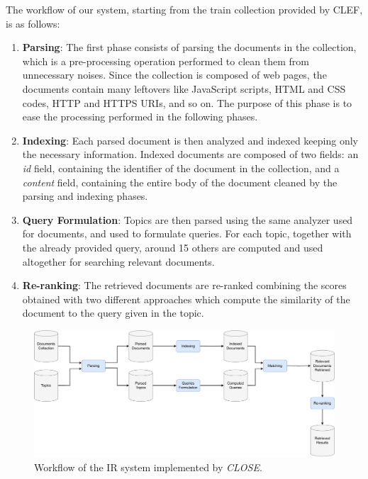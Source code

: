The workflow of our system, starting from the train collection provided by \ac{CLEF}, is as follows:
\begin{enumerate}
    \item \textbf{Parsing}: The first phase consists of parsing the documents in the collection, which is a pre-processing operation performed to clean them from unnecessary noises. Since the collection is composed of web pages, the documents contain many leftovers like JavaScript scripts, HTML and CSS codes, HTTP and HTTPS URIs, and so on. The purpose of this phase is to ease the processing performed in the following phases.

    \item \textbf{Indexing}: Each parsed document is then analyzed and indexed keeping only the necessary information. Indexed documents are composed of two fields: an \textit{id} field, containing the identifier of the document in the collection, and a \textit{content} field, containing the entire body of the document cleaned by the parsing and indexing phases.

    \item \textbf{Query Formulation}: Topics are then parsed using the same analyzer used for documents, and used to formulate queries. For each topic, together with the already provided query, around 15 others are computed and used altogether for searching relevant documents.

    \item \textbf{Re-ranking}: The retrieved documents are re-ranked combining the scores obtained with two different approaches which compute the similarity of the document to the query given in the topic.

\end{enumerate}

\begin{figure}[!h]
    \centering
    \includegraphics[width=\textwidth, height=\textheight, keepaspectratio]{figure/CLOSE_IR_Workflow (2).pdf}
    \caption{Workflow of the IR system implemented by \textit{CLOSE}.}
    \label{fig:CLOSE_IR_Workflow}
\end{figure}

